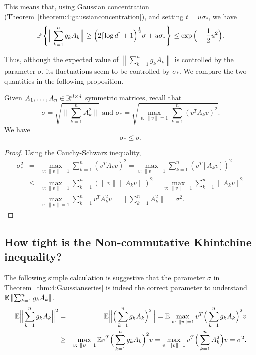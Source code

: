 This means that, using Gaussian concentration (Theorem~\ref{theorem:4:gaussianconcentration}), and setting $t = u\sigma_\ast$, we have
\begin{equation}
{\mathbb{P}}\left\{ \Big\| \sum_{k=1}^{n} g_k A_k \Big\| \geq \Big(  2\lceil \log d \rceil+1 \Big)^{\frac12} \sigma + u\sigma_\ast \right\} \leq \exp\Big( - \frac12u^2 \Big).
\end{equation}

Thus, although the expected value of $\left\| \sum_{k=1}^{n} g_k A_k \right\|$ is controlled by the parameter $\sigma$, its fluctuations seem to be controlled by $\sigma_\ast$. We compare the two quantities in the following proposition.

\begin{proposition}
 Given $A_1,\dots,A_n\in\mathbb{R}^{d\times d}$ symmetric matrices, recall that
 \[
  \sigma = \sqrt{\Big\| \sum_{k=1}^n A_k^2  \Big\|} \text{ and } \sigma_\ast = \sqrt{ \max_{v:\,\|v\|=1 } \sum_{k=1}^n \left(v^TA_kv\right)^2  }.
  \]
  We have
 \[
  \sigma_\ast \leq \sigma.
 \]
\end{proposition}

\begin{proof}
Using the Cauchy-Schwarz inequality,
\begin{eqnarray*}
 \sigma_\ast^2 & = & \max_{v:\,\|v\|=1 } \sum_{k=1}^n \left(v^TA_kv\right)^2  =  \max_{v:\,\|v\|=1 } \sum_{k=1}^n  \left(v^T \left[A_kv\right]\right)^2 \\
 & \leq & \max_{v:\,\|v\|=1 } \sum_{k=1}^n  \left( \|v\| \|A_kv\|\right)^2  =  \max_{v:\,\|v\|=1 } \sum_{k=1}^n  \|A_kv\|^2 \\
 & = & \max_{v:\,\|v\|=1 } \sum_{k=1}^n  v^TA_k^2v  =  \Big\| \sum_{k=1}^n  A_k^2 \Big\|  =  \sigma^2.
\end{eqnarray*}
\end{proof}


\subsection{How tight is the Non-commutative Khintchine inequality?}\label{sec:tightnessNCK}

The following simple calculation is suggestive that the parameter $\sigma$ in Theorem~\ref{thm:4:Gaussianseries} is indeed the correct parameter to understand $\mathbb{E} \left\| \sum_{k=1}^{n} g_k A_k \right\|$.
\begin{eqnarray}
 \mathbb{E} \Big\| \sum_{k=1}^{n} g_k A_k \Big\|^2 & = & \mathbb{E} \Big\| \Big( \sum_{k=1}^{n} g_k A_k \Big)^2 \Big\| = \mathbb{E} \max_{v:\ \|v\|=1} v^T\Big( \sum_{k=1}^{n} g_k A_k \Big)^2v \nonumber\\
 & \geq & \max_{v:\ \|v\|=1} \mathbb{E}  v^T\Big( \sum_{k=1}^{n} g_k A_k \Big)^2v = \max_{v:\ \|v\|=1}  v^T\Big( \sum_{k=1}^{n} A_k^2 \Big)v = \sigma^2. \nonumber
\end{eqnarray}

